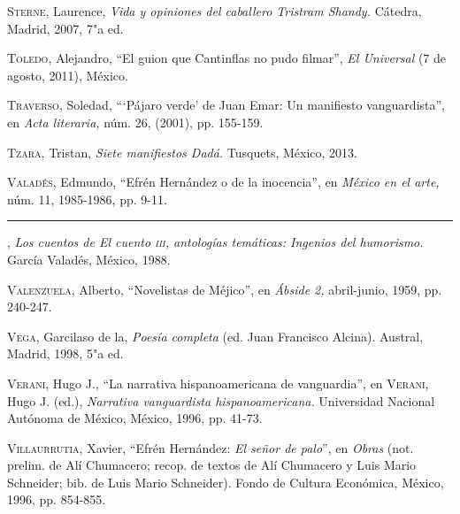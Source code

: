 \documentclass[14pt,twoside,final]{extbook} %
\begin{document}
\textsc{Sterne}, Laurence, \emph{Vida y opiniones del caballero Tristram Shandy.} Cátedra, Madrid, 2007, 7"a ed.\label{bib:sterne2007}

\textsc{Toledo}, Alejandro, ``El guion que Cantinflas no pudo filmar'', \emph{El Universal} (7 de agosto, 2011), México.\label{bib:toledo2011}

\textsc{Traverso}, Soledad, ``{}`Pájaro verde' de Juan Emar: Un manifiesto vanguardista'', en \emph{Acta literaria,} núm. 26, (2001), pp. 155-159.\label{bib:traverso2001}

\textsc{Tzara}, Tristan, \emph{Siete manifiestos Dadá.} Tusquets, México, 2013.\label{bib:tzara2013}

\textsc{Valadés}, Edmundo, ``Efrén Hernández o de la inocencia'', en \emph{México en el arte,} núm. 11, 1985-1986, pp. 9-11.\label{bib:valades1985}

\rule{1cm}{0.4pt}, \emph{Los cuentos de \emph{El cuento} \textsc{iii}, antologías temáticas: Ingenios del humorismo.} García Valadés, México, 1988.\label{bib:valades1988}

\textsc{Valenzuela}, Alberto, ``Novelistas de Méjico'', en \emph{Ábside 2,} abril-junio, 1959, pp. 240-247.\label{bib:valenzuela1959}

\textsc{Vega}, Garcilaso de la, \emph{Poesía completa} (ed. Juan Francisco Alcina). Austral, Madrid, 1998, 5"a ed.\label{bib:vega1998}

\textsc{Verani}, Hugo J., ``La narrativa hispanoamericana de vanguardia'', en \textsc{Verani}, Hugo J. (ed.),  \emph{Narrativa vanguardista hispanoamericana.} Universidad Nacional Autónoma de México, México, 1996, pp. 41-73.\label{bib:verani1996}

\textsc{Villaurrutia}, Xavier, ``Efrén Hernández: \emph{El señor de palo}'', en \emph{Obras} (not. prelim. de Alí Chumacero; recop. de textos de Alí Chumacero y Luis Mario Schneider; bib. de Luis Mario Schneider). Fondo de Cultura Económica, México, 1996, pp. 854-855.\label{bib:villaurrutia1996}
\end{document}
